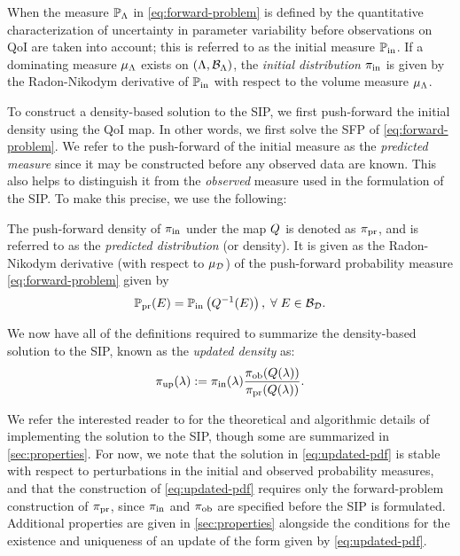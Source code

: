 \begin{defn}\label{defn:initial}
  When the measure $\mathbb{P}_{\Lambda}$ in \eqref{eq:forward-problem} is defined by the quantitative characterization of uncertainty in parameter variability before observations on QoI are taken into account; this is referred to as the initial measure $\operatorname*{\mathbb{P}_{in}}$.
  If a dominating measure $\mu_{\Lambda}$ exists on $({\Lambda}, \mathcal{B}_{{\Lambda}})$, the \emph{initial distribution} $\operatorname*{\pi_{in}}$ is given by the Radon-Nikodym derivative of $\operatorname*{\mathbb{P}_{in}}$ with respect to the volume measure $\mu_{{\Lambda}}$.
\end{defn}


To construct a density-based solution to the SIP, we first push-forward the initial density using the QoI map.
In other words, we first solve the SFP of \eqref{eq:forward-problem}.
We refer to the push-forward of the initial measure as the \emph{predicted measure} since it may be constructed before any observed data are known.
This also helps to distinguish it from the {\em observed} measure used in the formulation of the SIP.
To make this precise, we use the following:

\begin{defn}\label{defn:predicted}
  The push-forward density of $\operatorname*{\pi_{in}}$ under the map $Q$ is denoted as $\operatorname*{\pi_{pr}}$, and is referred to as the \emph{predicted distribution} (or density).
  It is given as the Radon-Nikodym derivative (with respect to $\mu_{\mathcal{D}}$) of the push-forward probability measure \eqref{eq:forward-problem} given by
  \begin{equation}\label{eq:predicted}
    \operatorname*{\mathbb{P}_{pr}} (E) = \operatorname*{\mathbb{P}_{in}} \left ( Q^{-1}(E) \right ), \; \forall \; E \in \mathcal{B}_{\mathcal{D}}.
  \end{equation}
\end{defn}

We now have all of the definitions required to summarize the density-based solution to the SIP, known as the \emph{updated density} as:
\begin{equation}\label{eq:updated-pdf}
	\operatorname*{\pi_{up}}(\lambda) := \operatorname*{\pi_{in}}(\lambda)\frac{\operatorname*{\pi_{ob}}(Q(\lambda))}{\operatorname*{\pi_{pr}}(Q(\lambda))}.
\end{equation}

We refer the interested reader to \cite{BJW18a} for the theoretical and algorithmic details of implementing the solution to the SIP, though some are summarized in \ref{sec:properties}.
For now, we note that the solution in \eqref{eq:updated-pdf} is stable with respect to perturbations in the initial and observed probability measures, and that the construction of \eqref{eq:updated-pdf} requires only the forward-problem construction of $\operatorname*{\pi_{pr}}$, since $\operatorname*{\pi_{in}}$ and $\operatorname*{\pi_{ob}}$ are specified before the SIP is formulated.
Additional properties are given in \ref{sec:properties} alongside the conditions for the existence and uniqueness of an update of the form given by \eqref{eq:updated-pdf}.

